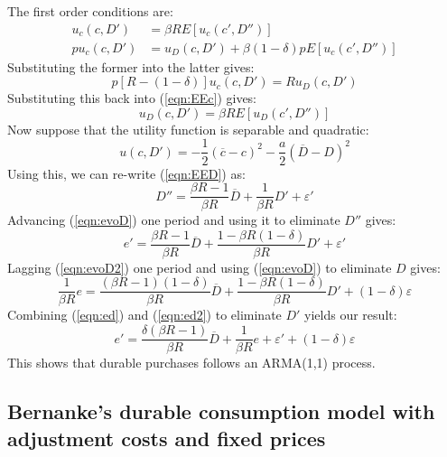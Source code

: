 The first order conditions are:
%
\begin{align}
 u_c(c, D') &= \beta R E \left[u_c(c', D'')\right] \label{eqn:EEc} \\
 p u_c(c, D') &= u_D(c, D') + \beta(1 - \delta) p E \left[u_c(c', D'')\right]
\end{align}
%
Substituting the former into the latter gives:
%
\begin{equation}
	p[R - (1 - \delta)] u_c(c, D') = R u_D(c, D')
\end{equation}
%
Substituting this back into (\ref{eqn:EEc}) gives:
%
\begin{equation}
 u_D(c, D') = \beta R E \left[u_D(c', D'')\right] \label{eqn:EED}
\end{equation}
%
Now suppose that the utility function is separable and quadratic:
%
\begin{equation}
 u(c, D') = -\frac{1}{2}(\overline{c} - c)^2 - \frac{a}{2}(\overline{D} - D)^2
\end{equation}
%
Using this, we can re-write (\ref{eqn:EED}) as:
%
\begin{equation}
 D'' = \frac{\beta R - 1}{\beta R} \overline{D} + \frac{1}{\beta R} D' + \varepsilon' \label{eqn:evoD2}
\end{equation}
%
Advancing (\ref{eqn:evoD}) one period and using it to eliminate \(D''\) gives:
%
\begin{equation}
 e' = \frac{\beta R - 1}{\beta R} \overline{D} + \frac{1 - \beta R (1 - \delta)}{\beta R} D' + \varepsilon' \label{eqn:ed}
\end{equation}
%
Lagging (\ref{eqn:evoD2}) one period and using (\ref{eqn:evoD}) to eliminate \(D\) gives:
%
\begin{equation}
 \frac{1}{\beta R} e = \frac{(\beta R - 1)(1 - \delta)}{\beta R} \overline{D} + \frac{1 - \beta R (1 - \delta)}{\beta R} D' + (1 - \delta)\varepsilon \label{eqn:ed2}
\end{equation}
%
Combining (\ref{eqn:ed}) and (\ref{eqn:ed2}) to eliminate \(D'\) yields our result:
%
\begin{equation}
 e' = \frac{\delta(\beta R - 1)}{\beta R} \overline{D} + \frac{1}{\beta R} e + \varepsilon' + (1 - \delta)\varepsilon
\end{equation}
%
This shows that durable purchases follows an ARMA(1,1) process.

\subsection{Bernanke's durable consumption model with adjustment costs and fixed prices}

